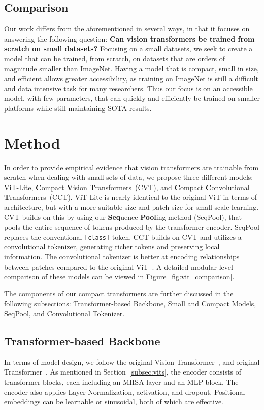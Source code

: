 \documentclass[10pt,twocolumn,letterpaper]{article}
\begin{document}
\subsection{Comparison}

Our work differs from the aforementioned in several ways, in that it focuses on answering the following question: \textbf{Can vision transformers be trained from scratch on small datasets?}
Focusing on a small datasets, we seek to create a model that can be trained, from scratch, on datasets that are orders of magnitude smaller than ImageNet.
Having a model that is compact, small in size, and efficient allows greater accessibility, as training on ImageNet is still a difficult and data intensive task for many researchers.
Thus our focus is on an accessible model, with few parameters, that can quickly and efficiently be trained on smaller platforms while still maintaining SOTA results.

\section{Method}

In order to provide empirical evidence that vision transformers are trainable from scratch when dealing with small sets of data, we propose three different models: ViT-Lite, \textbf{C}ompact \textbf{V}ision \textbf{T}ransformers~(CVT), and \textbf{C}ompact \textbf{C}onvolutional \textbf{T}ransformers~(CCT).
ViT-Lite is nearly identical to the original ViT in terms of architecture, but with a more suitable size and patch size for small-scale learning.
CVT builds on this by using our \textbf{Seq}uence \textbf{Pool}ing method (SeqPool), that pools the entire sequence of tokens produced by the transformer encoder. SeqPool replaces the conventional \verb|[class]| token.
CCT builds on CVT and utilizes a convolutional tokenizer, generating richer tokens and preserving local information. The convolutional tokenizer is better at encoding relationships between patches compared to the original ViT~\cite{dosovitskiy2020image}. A detailed modular-level comparison of these models can be viewed in Figure~\ref{fig:vit_comparison}.

The components of our compact transformers are further discussed in the following subsections: Transformer-based Backbone, Small and Compact Models, SeqPool, and Convolutional Tokenizer.

\subsection{Transformer-based Backbone}
\label{sec:method-backbone}
In terms of model design, we follow the original Vision Transformer~\cite{dosovitskiy2020image}, and original Transformer~\cite{vaswani2017attention}.
As mentioned in Section~\ref{subsec:vits}, the encoder consists of transformer blocks, each including an MHSA layer and an MLP block.
The encoder also applies Layer Normalization,  activation, and dropout. Positional embeddings can be learnable or sinusoidal, both of which are effective.
\end{document}
